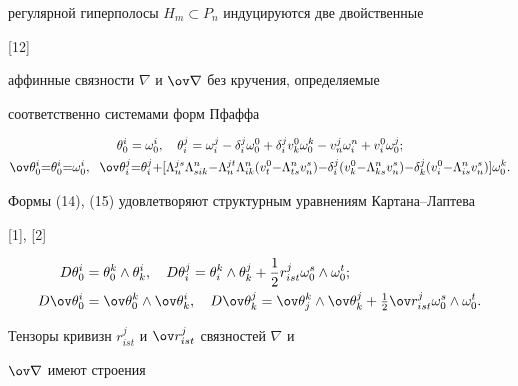 регулярной гиперполосы $H_m\subset P_n$ индуцируются две двойственные 


[12] 


аффинные связности $\nabla$ и $\ov\nabla$ без кручения, определяемые 


соответственно системами форм Пфаффа 


\begin{gather} 


\theta^i_0=\omega^i_0,\quad \theta^j_i=\omega^j_i- 


\delta^j_i\omega^0_0+\delta^j_i v^0_k\omega^k_0- 


v^j_n\omega^n_i+v^0_i\omega^j_0; \\ 


\ov\theta^i_0{=}\theta^i_0{=}\omega^i_0,\ \;


\ov\theta^j_i{=}\theta^j_i{+}[\Lambda^{j s}_n\Lambda^n_{s i k}{-}


\Lambda^{j t}_n\Lambda^n_{i k}(v^0_t{-}\Lambda^n_{t s}v^s_n){-}


\delta^j_i(v^0_k{-}\Lambda^n_{k s}v^s_n){-}\delta^j_k 


(v^0_i{-}\Lambda^n_{is}v^s_n)]\omega^k_0. 


\end{gather} 


Формы (14), (15) удовлетворяют структурным уравнениям Картана--Лаптева 


[1], [2] 


\begin{equation} 


\begin{split}


D\theta^i_0&=\theta^k_0\wedge\theta^i_k,\quad 


D\theta^j_i=\theta^k_i\wedge\theta^j_k+\frac{1}{2} 


r^j_{is t}\omega^s_0\wedge\omega^t_0;\\ 


D\ov\theta^i_0&=\ov\theta^k_0\wedge\ov\theta^i_k,\quad 


D\ov\theta^j_k=\ov\theta^k_j\wedge\ov\theta^j_k+ 


\tfrac{1}{2}\ov r^j_{is t}\omega^s_0\wedge\omega^t_0. 


\end{split} 


\end{equation} 


Тензоры кривизн $r^j_{is t}$ и $\ov r^j_{is t}$ связностей $\nabla$ и 


$\ov\nabla$ имеют строения 


